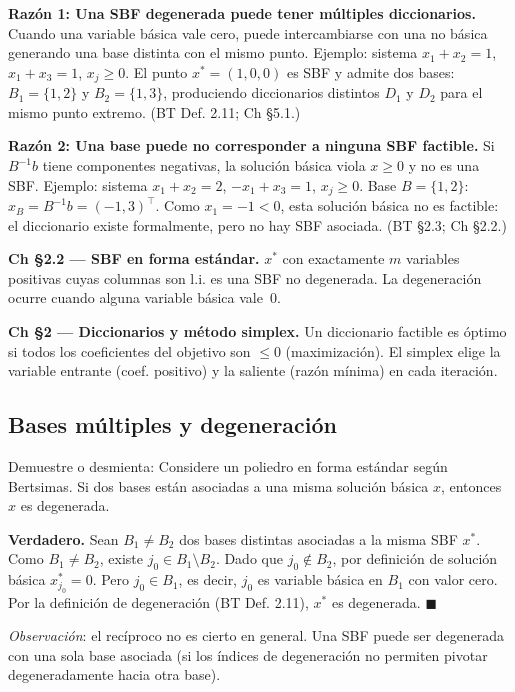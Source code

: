 \documentclass[12pt]{article}
\theoremstyle{plain}
\begin{document}
\begin{solucion}

\noindent\textbf{Razón 1: Una SBF degenerada puede tener múltiples diccionarios.} Cuando una variable básica vale cero, puede intercambiarse con una no básica generando una base distinta con el mismo punto. Ejemplo: sistema $x_1+x_2=1$, $x_1+x_3=1$, $x_j\geq 0$. El punto $x^*=(1,0,0)$ es SBF y admite dos bases: $B_1=\{1,2\}$ y $B_2=\{1,3\}$, produciendo diccionarios distintos $D_1$ y $D_2$ para el mismo punto extremo. (BT Def. 2.11; Ch §5.1.)

\noindent\textbf{Razón 2: Una base puede no corresponder a ninguna SBF factible.} Si $B^{-1}b$ tiene componentes negativas, la solución básica viola $x\geq 0$ y no es una SBF. Ejemplo: sistema $x_1+x_2=2$, $-x_1+x_3=1$, $x_j\geq 0$. Base $B=\{1,2\}$: $x_B = B^{-1}b = (-1,3)^\top$. Como $x_1=-1<0$, esta solución básica no es factible: el diccionario existe formalmente, pero no hay SBF asociada. (BT §2.3; Ch §2.2.)

\end{solucion}

\begin{teofund}
\textbf{Ch §2.2 — SBF en forma estándar.} $x^*$ con exactamente $m$ variables positivas cuyas columnas son l.i. es una SBF no degenerada. La degeneración ocurre cuando alguna variable básica vale~0.

\textbf{Ch §2 — Diccionarios y método simplex.} Un diccionario factible es óptimo si todos los coeficientes del objetivo son $\leq 0$ (maximización). El simplex elige la variable entrante (coef. positivo) y la saliente (razón mínima) en cada iteración.
\end{teofund}

\bigskip

\subsection{Bases múltiples y degeneración}

Demuestre o desmienta: Considere un poliedro en forma estándar según Bertsimas. Si dos
bases están asociadas a una misma solución básica $x$, entonces $x$ es degenerada.

\begin{solucion}

\textbf{Verdadero.} Sean $B_1 \neq B_2$ dos bases distintas asociadas a la misma SBF $x^*$. Como $B_1 \neq B_2$, existe $j_0 \in B_1 \setminus B_2$. Dado que $j_0 \notin B_2$, por definición de solución básica $x^*_{j_0} = 0$. Pero $j_0 \in B_1$, es decir, $j_0$ es variable básica en $B_1$ con valor cero. Por la definición de degeneración (BT Def. 2.11), $x^*$ es degenerada. $\blacksquare$

\textit{Observación}: el recíproco no es cierto en general. Una SBF puede ser degenerada con una sola base asociada (si los índices de degeneración no permiten pivotar degeneradamente hacia otra base).

\end{solucion}
\end{document}
